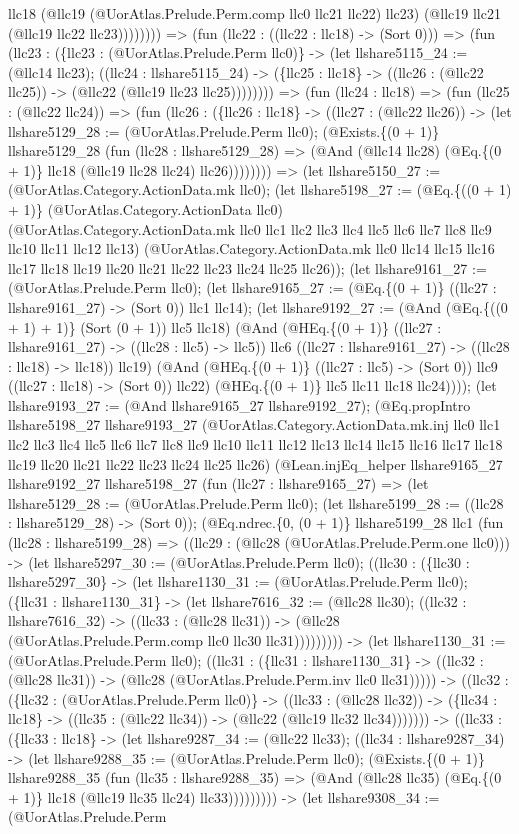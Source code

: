 \documentclass[11pt]{article}
\begin{document}
llc18 (@llc19 (@UorAtlas.Prelude.Perm.comp llc0 llc21 llc22) llc23) (@llc19 llc21 (@llc19 llc22 llc23)))))))) => (fun (llc22 : ((llc22 : llc18) -> (Sort 0))) => (fun (llc23 : (\{llc23 : (@UorAtlas.Prelude.Perm llc0)\} -> (let llshare5115\_24 := (@llc14 llc23); ((llc24 : llshare5115\_24) -> (\{llc25 : llc18\} -> ((llc26 : (@llc22 llc25)) -> (@llc22 (@llc19 llc23 llc25)))))))) => (fun (llc24 : llc18) => (fun (llc25 : (@llc22 llc24)) => (fun (llc26 : (\{llc26 : llc18\} -> ((llc27 : (@llc22 llc26)) -> (let llshare5129\_28 := (@UorAtlas.Prelude.Perm llc0); (@Exists.\{(0 + 1)\} llshare5129\_28 (fun (llc28 : llshare5129\_28) => (@And (@llc14 llc28) (@Eq.\{(0 + 1)\} llc18 (@llc19 llc28 llc24) llc26)))))))) => (let llshare5150\_27 := (@UorAtlas.Category.ActionData.mk llc0); (let llshare5198\_27 := (@Eq.\{((0 + 1) + 1)\} (@UorAtlas.Category.ActionData llc0) (@UorAtlas.Category.ActionData.mk llc0 llc1 llc2 llc3 llc4 llc5 llc6 llc7 llc8 llc9 llc10 llc11 llc12 llc13) (@UorAtlas.Category.ActionData.mk llc0 llc14 llc15 llc16 llc17 llc18 llc19 llc20 llc21 llc22 llc23 llc24 llc25 llc26)); (let llshare9161\_27 := (@UorAtlas.Prelude.Perm llc0); (let llshare9165\_27 := (@Eq.\{(0 + 1)\} ((llc27 : llshare9161\_27) -> (Sort 0)) llc1 llc14); (let llshare9192\_27 := (@And (@Eq.\{((0 + 1) + 1)\} (Sort (0 + 1)) llc5 llc18) (@And (@HEq.\{(0 + 1)\} ((llc27 : llshare9161\_27) -> ((llc28 : llc5) -> llc5)) llc6 ((llc27 : llshare9161\_27) -> ((llc28 : llc18) -> llc18)) llc19) (@And (@HEq.\{(0 + 1)\} ((llc27 : llc5) -> (Sort 0)) llc9 ((llc27 : llc18) -> (Sort 0)) llc22) (@HEq.\{(0 + 1)\} llc5 llc11 llc18 llc24)))); (let llshare9193\_27 := (@And llshare9165\_27 llshare9192\_27); (@Eq.propIntro llshare5198\_27 llshare9193\_27 (@UorAtlas.Category.ActionData.mk.inj llc0 llc1 llc2 llc3 llc4 llc5 llc6 llc7 llc8 llc9 llc10 llc11 llc12 llc13 llc14 llc15 llc16 llc17 llc18 llc19 llc20 llc21 llc22 llc23 llc24 llc25 llc26) (@Lean.injEq\_helper llshare9165\_27 llshare9192\_27 llshare5198\_27 (fun (llc27 : llshare9165\_27) => (let llshare5129\_28 := (@UorAtlas.Prelude.Perm llc0); (let llshare5199\_28 := ((llc28 : llshare5129\_28) -> (Sort 0)); (@Eq.ndrec.\{0, (0 + 1)\} llshare5199\_28 llc1 (fun (llc28 : llshare5199\_28) => ((llc29 : (@llc28 (@UorAtlas.Prelude.Perm.one llc0))) -> (let llshare5297\_30 := (@UorAtlas.Prelude.Perm llc0); ((llc30 : (\{llc30 : llshare5297\_30\} -> (let llshare1130\_31 := (@UorAtlas.Prelude.Perm llc0); (\{llc31 : llshare1130\_31\} -> (let llshare7616\_32 := (@llc28 llc30); ((llc32 : llshare7616\_32) -> ((llc33 : (@llc28 llc31)) -> (@llc28 (@UorAtlas.Prelude.Perm.comp llc0 llc30 llc31))))))))) -> (let llshare1130\_31 := (@UorAtlas.Prelude.Perm llc0); ((llc31 : (\{llc31 : llshare1130\_31\} -> ((llc32 : (@llc28 llc31)) -> (@llc28 (@UorAtlas.Prelude.Perm.inv llc0 llc31))))) -> ((llc32 : (\{llc32 : (@UorAtlas.Prelude.Perm llc0)\} -> ((llc33 : (@llc28 llc32)) -> (\{llc34 : llc18\} -> ((llc35 : (@llc22 llc34)) -> (@llc22 (@llc19 llc32 llc34))))))) -> ((llc33 : (\{llc33 : llc18\} -> (let llshare9287\_34 := (@llc22 llc33); ((llc34 : llshare9287\_34) -> (let llshare9288\_35 := (@UorAtlas.Prelude.Perm llc0); (@Exists.\{(0 + 1)\} llshare9288\_35 (fun (llc35 : llshare9288\_35) => (@And (@llc28 llc35) (@Eq.\{(0 + 1)\} llc18 (@llc19 llc35 llc24) llc33))))))))) -> (let llshare9308\_34 := (@UorAtlas.Prelude.Perm 
\end{document}
